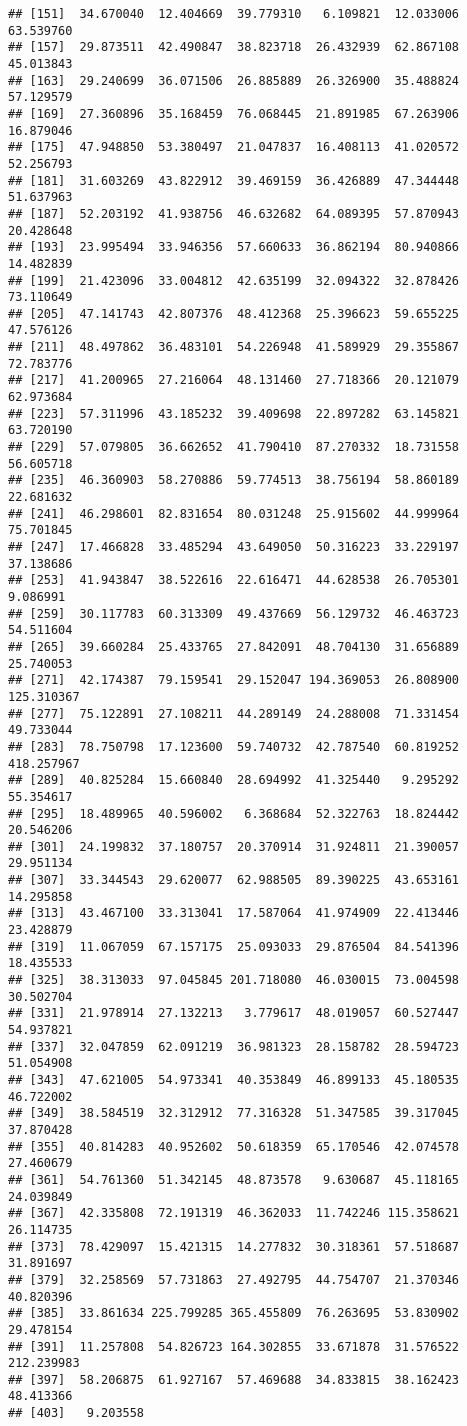 \documentclass[
]{article}
\begin{document}
\begin{verbatim}
## [151]  34.670040  12.404669  39.779310   6.109821  12.033006  63.539760
## [157]  29.873511  42.490847  38.823718  26.432939  62.867108  45.013843
## [163]  29.240699  36.071506  26.885889  26.326900  35.488824  57.129579
## [169]  27.360896  35.168459  76.068445  21.891985  67.263906  16.879046
## [175]  47.948850  53.380497  21.047837  16.408113  41.020572  52.256793
## [181]  31.603269  43.822912  39.469159  36.426889  47.344448  51.637963
## [187]  52.203192  41.938756  46.632682  64.089395  57.870943  20.428648
## [193]  23.995494  33.946356  57.660633  36.862194  80.940866  14.482839
## [199]  21.423096  33.004812  42.635199  32.094322  32.878426  73.110649
## [205]  47.141743  42.807376  48.412368  25.396623  59.655225  47.576126
## [211]  48.497862  36.483101  54.226948  41.589929  29.355867  72.783776
## [217]  41.200965  27.216064  48.131460  27.718366  20.121079  62.973684
## [223]  57.311996  43.185232  39.409698  22.897282  63.145821  63.720190
## [229]  57.079805  36.662652  41.790410  87.270332  18.731558  56.605718
## [235]  46.360903  58.270886  59.774513  38.756194  58.860189  22.681632
## [241]  46.298601  82.831654  80.031248  25.915602  44.999964  75.701845
## [247]  17.466828  33.485294  43.649050  50.316223  33.229197  37.138686
## [253]  41.943847  38.522616  22.616471  44.628538  26.705301   9.086991
## [259]  30.117783  60.313309  49.437669  56.129732  46.463723  54.511604
## [265]  39.660284  25.433765  27.842091  48.704130  31.656889  25.740053
## [271]  42.174387  79.159541  29.152047 194.369053  26.808900 125.310367
## [277]  75.122891  27.108211  44.289149  24.288008  71.331454  49.733044
## [283]  78.750798  17.123600  59.740732  42.787540  60.819252 418.257967
## [289]  40.825284  15.660840  28.694992  41.325440   9.295292  55.354617
## [295]  18.489965  40.596002   6.368684  52.322763  18.824442  20.546206
## [301]  24.199832  37.180757  20.370914  31.924811  21.390057  29.951134
## [307]  33.344543  29.620077  62.988505  89.390225  43.653161  14.295858
## [313]  43.467100  33.313041  17.587064  41.974909  22.413446  23.428879
## [319]  11.067059  67.157175  25.093033  29.876504  84.541396  18.435533
## [325]  38.313033  97.045845 201.718080  46.030015  73.004598  30.502704
## [331]  21.978914  27.132213   3.779617  48.019057  60.527447  54.937821
## [337]  32.047859  62.091219  36.981323  28.158782  28.594723  51.054908
## [343]  47.621005  54.973341  40.353849  46.899133  45.180535  46.722002
## [349]  38.584519  32.312912  77.316328  51.347585  39.317045  37.870428
## [355]  40.814283  40.952602  50.618359  65.170546  42.074578  27.460679
## [361]  54.761360  51.342145  48.873578   9.630687  45.118165  24.039849
## [367]  42.335808  72.191319  46.362033  11.742246 115.358621  26.114735
## [373]  78.429097  15.421315  14.277832  30.318361  57.518687  31.891697
## [379]  32.258569  57.731863  27.492795  44.754707  21.370346  40.820396
## [385]  33.861634 225.799285 365.455809  76.263695  53.830902  29.478154
## [391]  11.257808  54.826723 164.302855  33.671878  31.576522 212.239983
## [397]  58.206875  61.927167  57.469688  34.833815  38.162423  48.413366
## [403]   9.203558
\end{verbatim}
\end{document}
